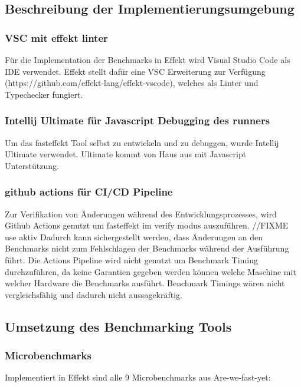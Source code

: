 
\subsection{Beschreibung der Implementierungsumgebung}

\subsubsection{VSC mit effekt linter}

Für die Implementation der Benchmarks in Effekt wird Visual Studio Code als IDE verwendet.
Effekt stellt dafür eine VSC Erweiterung zur Verfügung (https://github.com/effekt-lang/effekt-vscode), welches als Linter und Typechecker fungiert. 

\subsubsection{Intellij Ultimate für Javascript Debugging des runners}
Um das fasteffekt Tool selbst zu entwickeln und zu debuggen, wurde Intellij Ultimate verwendet. Ultimate kommt von Haus aus mit Javascript Unterstützung.

\subsubsection{github actions für CI/CD Pipeline}
Zur Verifikation von Änderungen während des Entwicklungsprozesses, wird Github Actions genutzt um fasteffekt im verify modus auszuführen. //FIXME use aktiv
 Dadurch kann sichergestellt werden, dass Änderungen an den Benchmarks nicht zum Fehlschlagen der Benchmarks während der Ausführung führt. Die Actions Pipeline wird nicht genutzt um Benchmark Timing durchzuführen, da keine Garantien gegeben werden können welche Maschine mit welcher Hardware die Benchmarks ausführt. Benchmark Timings wären nicht vergleichsfähig und dadurch nicht aussagekräftig.
    
\subsection{ Umsetzung des Benchmarking Tools } 
\subsubsection{ Microbenchmarks }
Implementiert in Effekt sind alle 9 Microbenchmarks aus Are-we-fast-yet:

